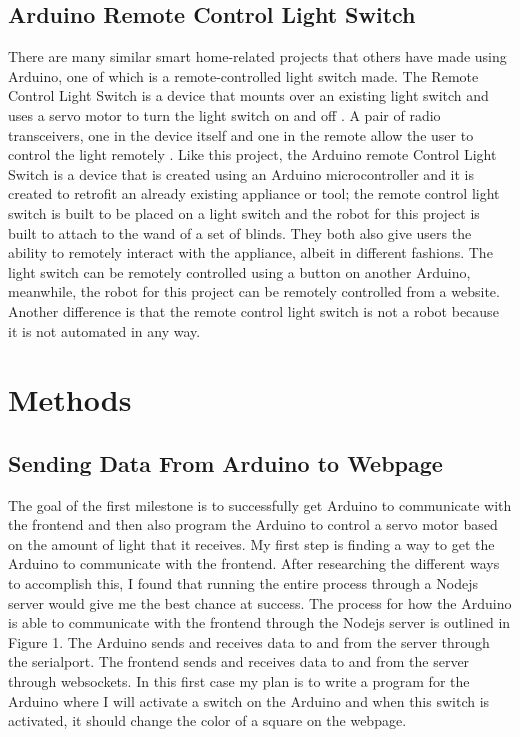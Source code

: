 \documentclass[10pt,twocolumn]{article}
\begin{document}
\subsection{Arduino Remote Control Light Switch}
There are many similar smart home-related projects that others have made using Arduino, one of which is a remote-controlled light switch made. The Remote Control Light Switch is a device that mounts over an existing light switch and uses a servo motor to turn the light switch on and off \cite{MerrittRemoteControlLightSwitch}. A pair of radio transceivers, one in the device itself and one in the remote allow the user to control the light remotely \cite{MerrittRemoteControlLightSwitch}. Like this project, the Arduino remote Control Light Switch is a device that is created using an Arduino microcontroller and it is created to retrofit an already existing appliance or tool; the remote control light switch is built to be placed on a light switch and the robot for this project is built to attach to the wand of a set of blinds. They both also give users the ability to remotely interact with the appliance, albeit in different fashions. The light switch can be remotely controlled using a button on another Arduino, meanwhile, the robot for this project can be remotely controlled from a website. Another difference is that the remote control light switch is not a robot because it is not automated in any way.


\section{Methods}

\subsection{Sending Data From Arduino to Webpage}

The goal of the first milestone is to successfully get Arduino to communicate with the frontend and then also program the Arduino to control a servo motor based on the amount of light that it receives. My first step is finding a way to get the Arduino to communicate with the frontend. After researching the different ways to accomplish this, I found that running the entire process through a Nodejs server would give me the best chance at success. The process for how the Arduino is able to communicate with the frontend through the Nodejs server is outlined in Figure 1. The Arduino sends and receives data to and from the server through the serialport. The frontend sends and receives data to and from the server through websockets. In this first case my plan is to write a program for the Arduino where I will activate a switch on the Arduino and when this switch is activated, it should change the color of a square on the webpage.
\end{document}
